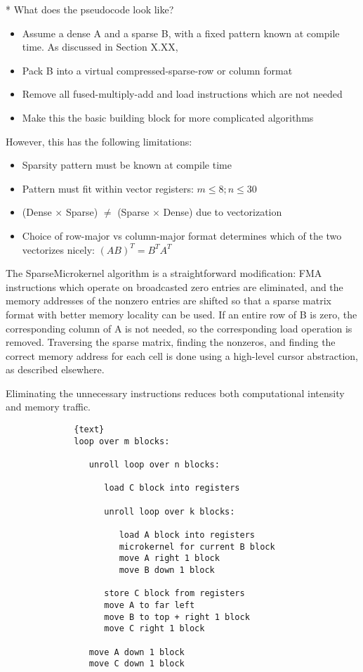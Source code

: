 * What does the pseudocode look like?

\begin{itemize}
    \item Assume a dense A and a sparse B, with a fixed pattern known at compile time. As discussed in Section X.XX, 
    \item Pack B into a virtual compressed-sparse-row or column format
    \item Remove all fused-multiply-add and load instructions which are not needed
    \item Make this the basic building block for more complicated algorithms 
\end{itemize}




However, this has the following limitations:
\begin{itemize}
    \item Sparsity pattern must be known at compile time
    \item Pattern must fit within vector registers: $m \leq 8;  n \leq 30$
    \item (Dense $\times$ Sparse) $\neq$ (Sparse $\times$ Dense) due to vectorization
    \item Choice of row-major vs column-major format determines which of the two vectorizes nicely: $(AB)^T = B^T A^T$
\end{itemize}




The SparseMicrokernel algorithm is a straightforward modification: FMA instructions which operate on 
broadcasted zero entries are eliminated, and the memory addresses of the nonzero entries are 
shifted so that a sparse matrix format with better memory locality can be used. If an entire 
row of B is zero, the corresponding column of A is not needed, so the corresponding load 
operation is removed. Traversing the sparse matrix, finding the nonzeros, and finding the correct
memory address for each cell is done using a high-level cursor abstraction, as described elsewhere.   

Eliminating the unnecessary instructions reduces both computational intensity and memory traffic.


\begin{figure}[ht]
      \begin{verbatim}
        {text}
        loop over m blocks:

           unroll loop over n blocks:

              load C block into registers

              unroll loop over k blocks:

                 load A block into registers
                 microkernel for current B block
                 move A right 1 block
                 move B down 1 block

              store C block from registers
              move A to far left
              move B to top + right 1 block
              move C right 1 block

           move A down 1 block
           move C down 1 block
      \end{verbatim}
\end{figure}


